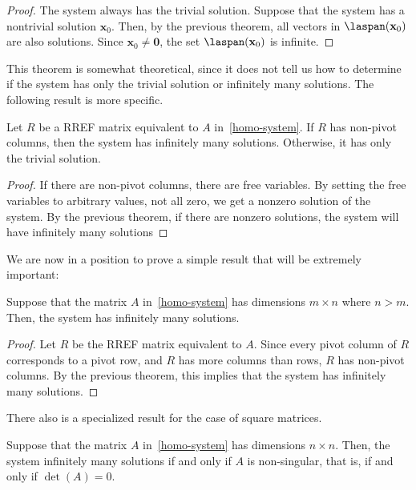 \documentclass[12pt]{article}
\begin{document}
\begin{proof} The system always has the trivial solution. Suppose that the system has a nontrivial solution $\mathbf{x}_0$. Then, by the previous theorem, all vectors in $\laspan(\mathbf{x}_0)$ are also solutions. Since $\mathbf{x}_0\ne\mathbf{0}$, the set $\laspan(\mathbf{x}_0)$ is infinite.
\end{proof}

This theorem is somewhat theoretical, since it does not tell us how to determine if the system has only the trivial solution or infinitely many solutions. The following result is more specific.

\begin{theorem} Let $R$ be a RREF matrix equivalent to $A$ in~\ref{homo-system}. If $R$ has non-pivot columns, then the system has infinitely many solutions. Otherwise, it has only the trivial solution.
\end{theorem}
\begin{proof} If there are non-pivot columns, there are free variables. By setting the free variables to arbitrary values, not all zero, we get a nonzero solution of the system. By the previous theorem, if there are nonzero solutions, the system will have infinitely many solutions
\end{proof}

We are now in a position to prove a simple result that will be extremely important:
\begin{theorem} Suppose that the matrix $A$ in~\ref{homo-system} has dimensions $m\times n$ where $n>m$. Then, the system has infinitely many solutions.
\end{theorem}
\begin{proof}
Let $R$ be the RREF matrix equivalent to $A$. Since every pivot column of $R$ corresponds to a pivot row, and $R$ has more columns than rows, $R$ has non-pivot columns. By the previous theorem, this implies that the system has infinitely many solutions.
\end{proof}

There also is a specialized result for the case of square matrices.

\begin{theorem} Suppose that the matrix $A$ in~\ref{homo-system} has dimensions $n\times n$. Then, the system infinitely many solutions if and only if $A$ is non-singular, that is, if and only if $\det(A)=0$.
\end{theorem}
\end{document}
